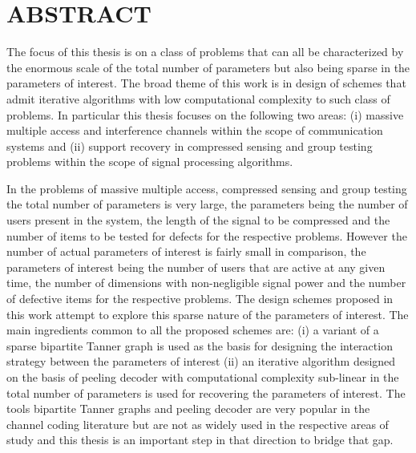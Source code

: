%
%
%
%

\chapter*{ABSTRACT}

\pagestyle{plain} %
\setcounter{page}{2}

\indent The focus of this thesis is on a class of problems that can all be characterized by the enormous scale of the total number of parameters but also being sparse in the parameters of interest. The broad theme of this work is in design of schemes that admit iterative algorithms with low computational complexity to such class of problems. In particular this thesis focuses on the following two areas: (i) massive multiple access and interference channels within the scope of communication systems and (ii) support recovery in compressed sensing and group testing problems within the scope of signal processing algorithms. 

In the problems of massive multiple access, compressed sensing and group testing the total number of parameters is very large, the parameters being the number of users present in the system, the length of the signal to be compressed and the number of items to be tested for defects for the respective problems. However the number of actual parameters of interest is fairly small in comparison, the parameters of interest being the number of users that are active at any given time, the number of dimensions with non-negligible signal power and the number of defective items for the respective problems. The design schemes proposed in this work attempt to explore this sparse nature of the parameters of interest. The main ingredients common to all the proposed schemes are: (i) a variant of a sparse bipartite Tanner graph is used as the basis for designing the interaction strategy between the parameters of interest (ii) an iterative algorithm designed on the basis of peeling decoder with computational complexity sub-linear in the total number of parameters is used for recovering the parameters of interest. The tools bipartite Tanner graphs and peeling decoder are very popular in the channel coding literature \cite{richardson2008modern} but are not as widely used in the respective areas of study and this thesis is an important step in that direction to bridge that gap.

